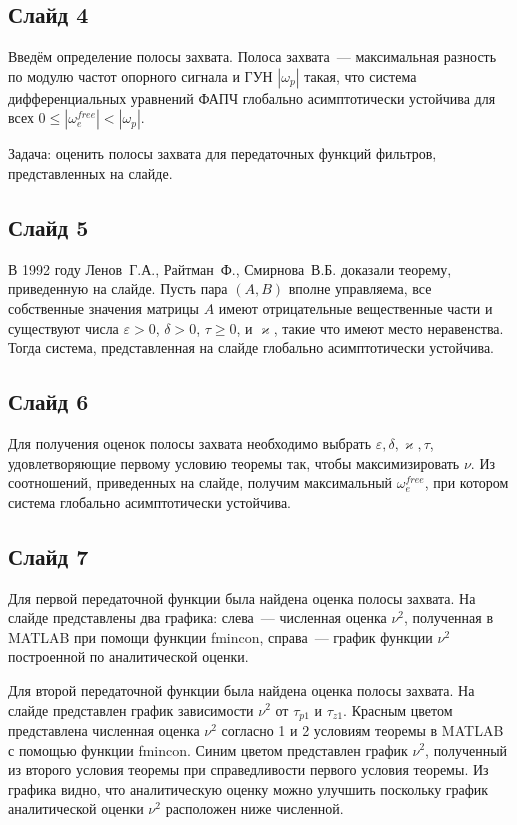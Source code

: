 \documentclass[a4paper,article,14pt]{extarticle}
\begin{document}
\subsection*{Слайд 4}
    Введём определение полосы захвата. Полоса захвата~--- максимальная разность по модулю частот опорного сигнала и ГУН $|\omega_p|$ такая, что система дифференциальных уравнений ФАПЧ глобально асимптотически устойчива для всех $0 \leqslant |\omega_e^{free}|<|\omega_p|$. 
    
Задача: оценить полосы захвата для передаточных функций фильтров, представленных на слайде.
    
\subsection*{Слайд 5}
В 1992 году Ленов~Г.\:А., Райтман~Ф., Смирнова~В.\:Б. доказали теорему, приведенную на слайде. Пусть пара $(A, B)$ вполне управляема, все собственные значения матрицы $A$ имеют отрицательные вещественные части и существуют числа $\varepsilon > 0$, $\delta > 0$, $\tau \geqslant 0$, и $\varkappa$, такие что имеют место неравенства. Тогда система, представленная на слайде глобально асимптотически устойчива.

\subsection*{Слайд 6}
Для получения оценок полосы захвата необходимо выбрать $\varepsilon, \delta, \varkappa, \tau$, удовлетворяющие первому условию теоремы так, чтобы максимизировать $\nu$.  Из соотношений, приведенных на слайде, получим максимальный $\omega_e^{free}$, при котором система глобально асимптотически устойчива.

\subsection*{Слайд 7}
Для первой передаточной функции была найдена оценка полосы захвата. На слайде представлены два графика: слева~--- численная оценка $\nu^2$, полученная в MATLAB при помощи функции fmincon, справа~--- график функции $\nu^2$ построенной по аналитической оценки.

Для второй передаточной функции была найдена оценка полосы захвата. На слайде представлен график зависимости $\nu^2$ от $\tau_{p1}$ и $\tau_{z1}$. Красным цветом представлена численная оценка $\nu^2$ согласно 1 и 2 условиям теоремы в MATLAB с помощью функции fmincon. Синим цветом представлен график $\nu^2$, полученный из второго условия теоремы при справедливости первого условия теоремы. Из графика видно, что аналитическую оценку можно улучшить поскольку график аналитической оценки $\nu^2$ расположен ниже численной.
\end{document}
